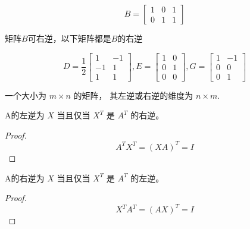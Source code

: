 \begin{example}
    \begin{equation} B=\left[\begin{array}{lll}1 & 0 & 1 \\ 0 & 1 & 1\end{array}\right] \end{equation}

    矩阵$B$可右逆，以下矩阵都是$B$的右逆

    \begin{equation} D=\frac{1}{2}\left[\begin{array}{cc}1 & -1 \\ -1 & 1 \\ 1 & 1\end{array}\right], E=\left[\begin{array}{ll}1 & 0 \\ 0 & 1 \\ 0 & 0\end{array}\right], G=\left[\begin{array}{cc}1 & -1 \\ 0 & 0 \\ 0 & 1\end{array}\right] \end{equation}
\end{example}

\begin{theorem}
一个大小为 $ m \times n $ 的矩阵， 其左逆或右逆的维度为 $ n \times m $.
\end{theorem}


\begin{theorem}
    A的左逆为 $ X $ 当且仅当 $ X^{T} $ 是 $ A^{T} $ 的右逆。
\end{theorem}

\begin{proof}
    \begin{equation}
A^{T} X^{T}=(X A)^{T}=I
\end{equation}
\end{proof}

\begin{theorem}
    A的右逆为 $ X $ 当且仅当 $ X^{T} $ 是 $ A^{T} $ 的左逆。
\end{theorem}

\begin{proof}
    \begin{equation}
X^{T} A^{T}=(A X)^{ {T}}=I
\end{equation}
\end{proof}


